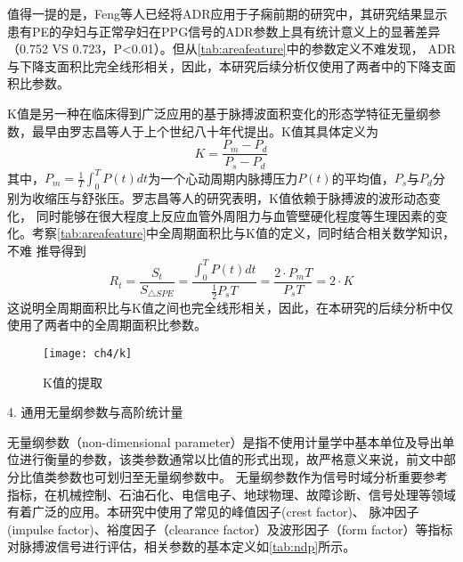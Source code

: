 值得一提的是，Feng等人已经将ADR应用于子痫前期的研究中，其研究结果显示患有PE的孕妇与正常孕妇在PPG信号的ADR参数上具有统计意义上的显著差异（0.752 VS 0.723，P<0.01）\cite{Feng2018}。但从\autoref{tab:areafeature}中的参数定义不难发现，
ADR与下降支面积比完全线形相关，因此，本研究后续分析仅使用了两者中的下降支面积比参数。

K值是另一种在临床得到广泛应用的基于脉搏波面积变化的形态学特征无量纲参数，最早由罗志昌等人于上个世纪八十年代提出\cite{Luo1988,PPGYY}。K值其具体定义为
\begin{equation}
    \label{equ:ppgk}
    K=\frac{P_m-P_d}{P_s-P_d}
\end{equation}
其中，$P_m=\frac{1}{T}\int_{0}^{T}P(t)dt$为一个心动周期内脉搏压力$P(t)$的平均值，$P_s$与$P_d$分别为收缩压与舒张压。罗志昌等人的研究表明，K值依赖于脉搏波的波形动态变化，
同时能够在很大程度上反应血管外周阻力与血管壁硬化程度等生理因素的变化。考察\autoref{tab:areafeature}中全周期面积比与K值的定义，同时结合相关数学知识，不难
推导得到
\begin{equation}
    \label{equ:kandart}
    R_t=\frac{S_t}{S_{\triangle SPE}}=\frac{\int_{0}^{T}P(t)dt}{\frac{1}{2}P_sT}=\frac{2\cdot P_mT}{P_sT}=2\cdot K
\end{equation}
这说明全周期面积比与K值之间也完全线形相关，因此，在本研究的后续分析中仅使用了两者中的全周期面积比参数。
\begin{figure}[htbp]
    \centering
    \texttt{[image: ch4/k]}
    \caption{\label{fig:k}K值的提取}
\end{figure}


4. 通用无量纲参数与高阶统计量

无量纲参数（non-dimensional parameter）是指不使用计量学中基本单位及导出单位进行衡量的参数，该类参数通常以比值的形式出现，故严格意义来说，前文中部分比值类参数也可划归至无量纲参数中。
无量纲参数作为信号时域分析重要参考指标，在机械控制、石油石化、电信电子、地球物理、故障诊断、信号处理等领域有着广泛的应用\cite{Jardine2006,Guo2014,Tu2013,Mendel1991}。本研究中使用了常见的峰值因子(crest factor)、
脉冲因子(impulse factor)、裕度因子（clearance factor）及波形因子（form factor）等指标对脉搏波信号进行评估，相关参数的基本定义如\autoref{tab:ndp}所示。

